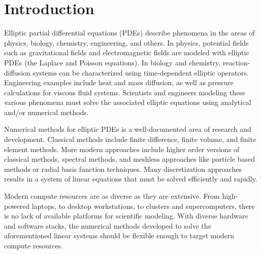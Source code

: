 \section{Introduction}

Elliptic partial differential equations (PDEs) describe phenomena in the areas of physics, biology, chemistry, engineering, and others. In physics, potential fields such as gravitational fields and electromagnetic fields are modeled with elliptic PDEs (the Laplace and Poisson equations). In biology and chemistry, reaction-diffusion systems can be characterized using time-dependent elliptic operators. Engineering examples include heat and mass diffusion, as well as pressure calculations for viscous fluid systems. Scientists and engineers modeling these various phenomena must solve the associated elliptic equations using analytical and/or numerical methods.

Numerical methods for elliptic PDEs is a well-documented area of research and development. Classical methods include finite difference, finite volume, and finite element methods. More modern approaches include higher order versions of classical methods, spectral methods, and meshless approaches like particle based methods or radial basis function techniques. Many discretization approaches results in a system of linear equations that must be solved efficiently and rapidly. 

Modern compute resources are as diverse as they are extensive. From high-powered laptops, to desktop workstations, to clusters and supercomputers, there is no lack of available platforms for scientific modeling. With diverse hardware and software stacks, the numerical methods developed to solve the aforementioned linear systems should be flexible enough to target modern compute resources. 

